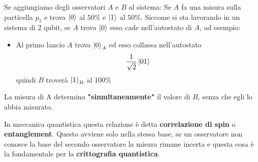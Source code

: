 \documentclass[a4paper]{article}
\begin{document}
\vspace{1em}
\noindent
Se aggiungiamo degli osservatori \( A \) e \( B \) al sistema:
\label{17-01-D3}
Se \( A \) fa una misura sulla particella \( p_1 \) e trova \( \ket{0} \) al \( 50\% \) e
\( \ket{1} \) al \( 50\% \). Siccome si sta lavorando in un sistema di 2 qubit, se \( A \)
trova \( \ket{0} \) esso cade nell'autostato di \( A \), ad esempio:
\begin{itemize}
  \item Al primo lancio \( A \) trova \( \ket{0}_A \) ed esso collassa nell'autostato
    \[
      \frac{1}{\sqrt{2}} \ket{01}
    \] 
    quindi \( B \) troverà \( \ket{1}_B \) al \( 100\% \)
\end{itemize}
La misura di A determina \textbf{"simultaneamente"} il valore di \( B \), senza che egli
lo abbia misurato.

\vspace{1em}
\noindent
In meccanica quantistica questa relazione è detta \textbf{correlazione di spin}
o \textbf{entanglement}. Questo avviene solo nella stessa base, se un osservatore non
conosce la base del secondo osservatore la misura rimane incerta e questa cosa è la
fondamentale per la \textbf{crittografia quantistica}.
\end{document}
